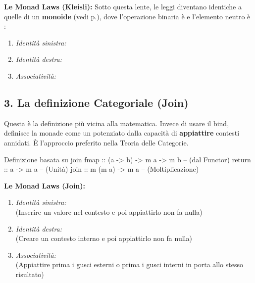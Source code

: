 \textbf{Le Monad Laws (Kleisli):}
Sotto questa lente, le leggi diventano identiche a quelle di un \textbf{monoide} (vedi p.\pageref{monoid}), dove l'operazione binaria è \code{>=>} e l'elemento neutro è :
\begin{enumerate}
    \item \textit{Identità sinistra:} 
    \item \textit{Identità destra:} 
    \item \textit{Associatività:} 
\end{enumerate}

\subsection{3. La definizione Categoriale (Join)}
Questa è la definizione più vicina alla matematica. Invece di usare il bind, definisce la monade come un  potenziato dalla capacità di \textbf{appiattire} contesti annidati. È l'approccio preferito nella Teoria delle Categorie.

\begin{haskellbox}{Definizione basata su join}
fmap   :: (a -> b) -> m a -> m b   -- (dal Functor)
return :: a -> m a                 -- (Unità)
join   :: m (m a) -> m a           -- (Moltiplicazione)
\end{haskellbox}

\textbf{Le Monad Laws (Join):}
\begin{enumerate}
    \item \textit{Identità sinistra:}  \\ (Inserire un valore nel contesto e poi appiattirlo non fa nulla)
    \item \textit{Identità destra:}  \\ (Creare un contesto interno e poi appiattirlo non fa nulla)
    \item \textit{Associatività:}  \\ (Appiattire prima i gusci esterni o prima i gusci interni in  porta allo stesso risultato)
\end{enumerate}

